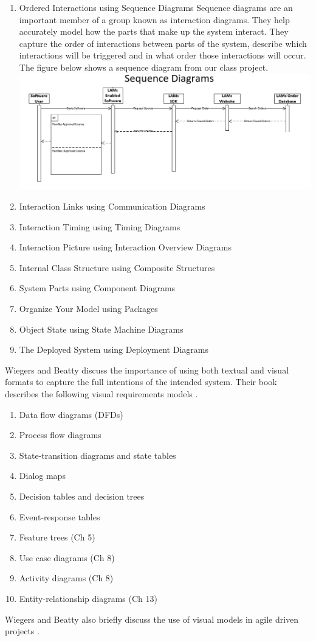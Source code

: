 \documentclass{acm_proc_article-sp}
\begin{document}
\begin{enumerate}
	\item Ordered Interactions using Sequence Diagrams
	\newline
	Sequence diagrams are an important member of a group known as interaction diagrams. They help accurately model how the parts that make up the system interact.  They capture the order of interactions between parts of the system, describe which interactions will be triggered and in what order those interactions will occur.
	\newline
	The figure below shows a sequence diagram from our class project.
	\newline
	\includegraphics[scale=0.3]{SequenceDiagram}
	\item Interaction Links using Communication Diagrams
	\item Interaction Timing using Timing Diagrams
	\item Interaction Picture using Interaction Overview Diagrams
	\item Internal Class Structure using Composite Structures
	\item System Parts using Component Diagrams
	\item Organize Your Model using Packages
	\item Object State using State Machine Diagrams
	\item The Deployed System using Deployment Diagrams
\end{enumerate}
Wiegers and Beatty discuss the importance of using both textual and visual formats to capture the full intentions of the intended system. Their book describes the following visual requirements models \cite{Lamport:SoftwareRequirements}.
\begin{enumerate}
	\item Data flow diagrams (DFDs)
	\item Process flow diagrams 
	\item State-transition diagrams and state tables
	\item Dialog maps
	\item Decision tables and decision trees
	\item Event-response tables
	\item Feature trees (Ch 5)
	\item Use case diagrams (Ch 8)
	\item Activity diagrams (Ch 8)
	\item Entity-relationship diagrams (Ch 13)
\end{enumerate}
Wiegers and Beatty also briefly discuss the use of visual models in agile driven projects \cite{Lamport:SoftwareRequirements}.
\end{document}
